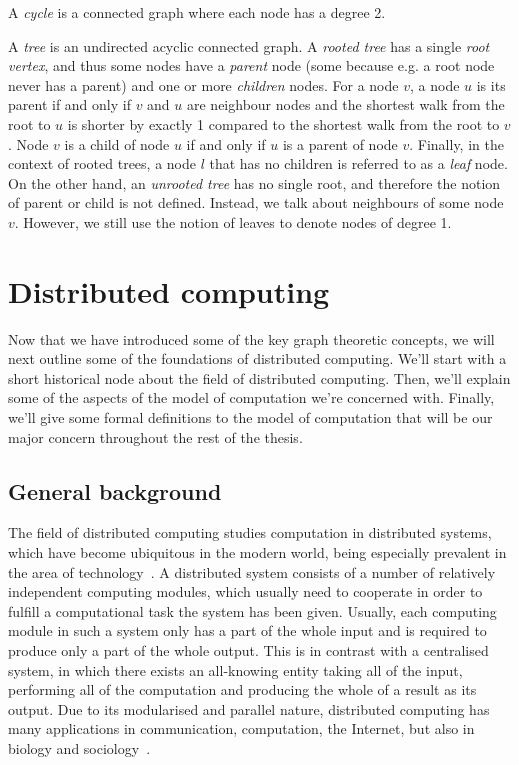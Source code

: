 A \emph{cycle} is a connected graph where each node has a degree 2.

A \emph{tree} is an undirected acyclic connected graph. A \emph{rooted tree}
has a single \emph{root vertex}, and thus some nodes have a \emph{parent} node
(some because e.g. a root node never has a parent) and one or more \emph{children}
nodes. For a node $v$, a node $u$ is its parent if and only if $v$ and $u$ are
neighbour nodes and the shortest walk from the root to $u$ is shorter by exactly
1 compared to the shortest walk from the root to $v$. Node $v$ is a child of node
$u$ if and only if $u$ is a parent of node $v$. Finally, in the context of rooted trees,
a node $l$ that has no children is referred to as a \emph{leaf} node.
On the other hand, an \emph{unrooted tree} has no single root, and therefore the notion of parent
or child is not defined. Instead, we talk about neighbours of some node $v$. However, we 
still use the notion of leaves to denote nodes of degree 1.

\section{Distributed computing}

Now that we have introduced some of the key graph theoretic concepts, we will
next outline some of the foundations of distributed computing. We'll start with
a short historical node about the field of distributed computing. Then, we'll
explain some of the aspects of the model of computation we're concerned with. Finally, 
we'll give some formal definitions to the model of computation that will be our
major concern throughout the rest of the thesis.

\subsection{General background}

The field of distributed computing studies computation in distributed systems, which
have become ubiquitous in the modern world, being especially prevalent
in the area of technology~\cite{Attiya2004}.
A distributed system consists of a number of relatively independent
computing modules, which usually need to cooperate in order to
fulfill a computational task the system has been given. Usually,
each computing module in such a system only has a part of the whole
input and is required to produce only a part of the whole output.
This is in contrast with a centralised system, in which there 
exists an all-knowing entity taking all of the input, performing all
of the computation and producing the whole of a result as its output.
Due to its modularised and parallel nature, distributed computing
has many applications in communication, computation, the Internet,
but also in biology and sociology~\cite{Wattenhofer2016}.

